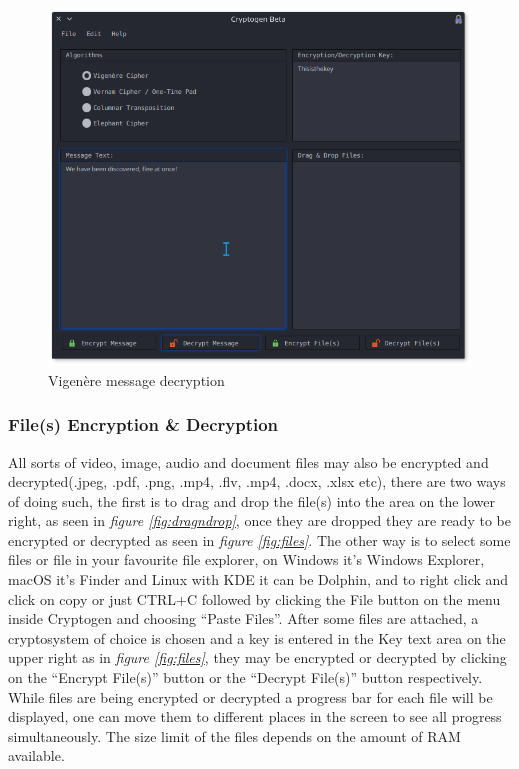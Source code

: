 \documentclass[11pt]{article}
\begin{document}
\begin{figure}[!htb]
\centering
\includegraphics[scale=0.55]{vigenere_message_plain}
\caption{Vigen\`ere message decryption} %
\label{fig:vigenere_message_plain} %
\end{figure}


\newpage
	\subsubsection{File(s) Encryption \& Decryption}
	All sorts of video, image, audio and document files may also be encrypted and decrypted(.jpeg, .pdf, .png, .mp4, .flv, .mp4, .docx, .xlsx  etc), there are two ways of doing such, the first is to drag and drop the file(s) into the area on the lower right, as seen in \textit{figure \ref{fig:dragndrop}}, once they are dropped they are ready to be encrypted or decrypted as seen in \textit{figure \ref{fig:files}}. The other way is to select some files or file in your favourite file explorer, on Windows it's Windows Explorer, macOS it's Finder and Linux with KDE it can be Dolphin, and to right click and click on copy or just CTRL+C followed by clicking the File button on the menu inside Cryptogen and choosing ``Paste Files''. After some files are attached, a cryptosystem of choice is chosen and a key is entered in the Key text area on the upper right as in \textit{figure \ref{fig:files}}, they may be encrypted or decrypted by clicking on the ``Encrypt File(s)'' button or the ``Decrypt File(s)'' button respectively. While files are being encrypted or decrypted a progress bar for each file will be displayed, one can move them to different places in the screen to see all progress simultaneously. The size limit of the files depends on the amount of RAM available.\\
\end{document}
